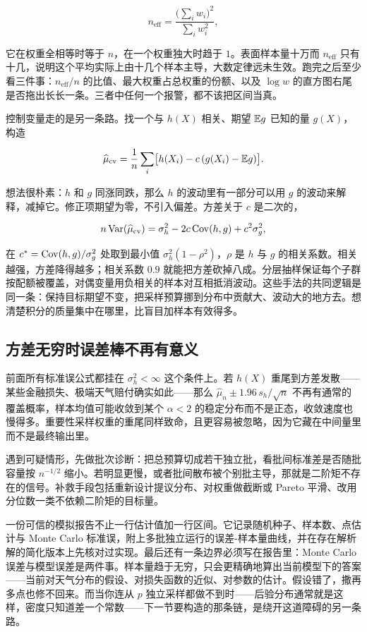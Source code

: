 \[
n_{\mathrm{eff}}
=\frac{\bigl(\sum_i w_i\bigr)^2}{\sum_i w_i^2},
\]

它在权重全相等时等于 \(n\)，在一个权重独大时趋于 \(1\)。表面样本量十万而 \(n_{\mathrm{eff}}\) 只有十几，说明这个平均实际上由十几个样本主导，大数定律远未生效。跑完之后至少看三件事：\(n_{\mathrm{eff}}/n\) 的比值、最大权重占总权重的份额、以及 \(\log w\) 的直方图右尾是否拖出长长一条。三者中任何一个报警，都不该把区间当真。

控制变量走的是另一条路。找一个与 \(h(X)\) 相关、期望 \(\mathbb{E} g\) 已知的量 \(g(X)\)，构造

\[
\widehat\mu_{\mathrm{cv}}
=\frac1n\sum_i\bigl[h(X_i)-c\,(g(X_i)-\mathbb{E} g)\bigr].
\]

想法很朴素：\(h\) 和 \(g\) 同涨同跌，那么 \(h\) 的波动里有一部分可以用 \(g\) 的波动来解释，减掉它。修正项期望为零，不引入偏差。方差关于 \(c\) 是二次的，

\[
n\operatorname{Var}(\widehat\mu_{\mathrm{cv}})
=\sigma_h^2-2c\operatorname{Cov}(h,g)+c^2\sigma_g^2,
\]

在 \(c^{*}=\operatorname{Cov}(h,g)/\sigma_g^2\) 处取到最小值 \(\sigma_h^2(1-\rho^2)\)，\(\rho\) 是 \(h\) 与 \(g\) 的相关系数。相关越强，方差降得越多；相关系数 \(0.9\) 就能把方差砍掉八成。分层抽样保证每个子群按配额被覆盖，对偶变量用负相关的样本对互相抵消波动。这些手法的共同逻辑是同一条：保持目标期望不变，把采样预算挪到分布中贡献大、波动大的地方去。想清楚积分的质量集中在哪里，比盲目加样本有效得多。

\subsection{方差无穷时误差棒不再有意义}

前面所有标准误公式都挂在 \(\sigma_h^2<\infty\) 这个条件上。若 \(h(X)\) 重尾到方差发散——某些金融损失、极端天气赔付确实如此——那么 \(\widehat\mu_n\pm1.96\,s_h/\sqrt n\) 不再有通常的覆盖概率，样本均值可能收敛到某个 \(\alpha<2\) 的稳定分布而不是正态，收敛速度也慢得多。重要性采样权重的重尾同样致命，且更容易被忽略，因为它藏在中间量里而不是最终输出里。

遇到可疑情形，先做批次诊断：把总预算切成若干独立批，看批间标准差是否随批容量按 \(n^{-1/2}\) 缩小。若明显更慢，或者批间散布被个别批主导，那就是二阶矩不存在的信号。补救手段包括重新设计提议分布、对权重做截断或 Pareto 平滑、改用分位数一类不依赖二阶矩的目标量。

一份可信的模拟报告不止一行估计值加一行区间。它记录随机种子、样本数、点估计与 Monte Carlo 标准误，附上多批独立运行的误差-样本量曲线，并在存在解析解的简化版本上先核对过实现。最后还有一条边界必须写在报告里：Monte Carlo 误差与模型误差是两件事。样本量趋于无穷，只会更精确地算出当前模型下的答案——当前对天气分布的假设、对损失函数的近似、对参数的估计。假设错了，撒再多点也修不回来。而当你连从 \(p\) 独立采样都做不到时——后验分布通常就是这样，密度只知道差一个常数——下一节要构造的那条链，是绕开这道障碍的另一条路。
